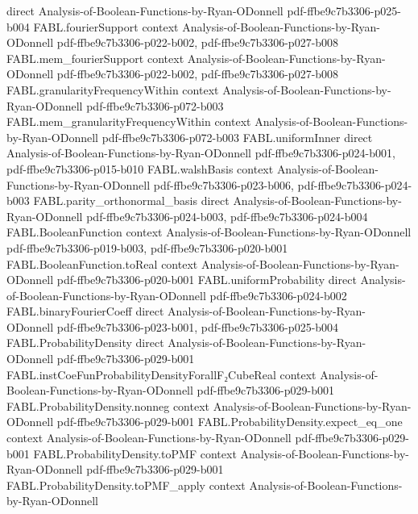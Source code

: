 \begin{theorem}
  {direct}
  {Analysis-of-Boolean-Functions-by-Ryan-ODonnell}
  {pdf-ffbe9c7b3306-p025-b004}
\proofstep
  {FABL.fourierSupport}
  {context}
  {Analysis-of-Boolean-Functions-by-Ryan-ODonnell}
  {pdf-ffbe9c7b3306-p022-b002,
    pdf-ffbe9c7b3306-p027-b008}
\proofstep
  {FABL.mem_fourierSupport}
  {context}
  {Analysis-of-Boolean-Functions-by-Ryan-ODonnell}
  {pdf-ffbe9c7b3306-p022-b002,
    pdf-ffbe9c7b3306-p027-b008}
\proofstep
  {FABL.granularityFrequencyWithin}
  {context}
  {Analysis-of-Boolean-Functions-by-Ryan-ODonnell}
  {pdf-ffbe9c7b3306-p072-b003}
\proofstep
  {FABL.mem_granularityFrequencyWithin}
  {context}
  {Analysis-of-Boolean-Functions-by-Ryan-ODonnell}
  {pdf-ffbe9c7b3306-p072-b003}
\proofstep
  {FABL.uniformInner}
  {direct}
  {Analysis-of-Boolean-Functions-by-Ryan-ODonnell}
  {pdf-ffbe9c7b3306-p024-b001,
    pdf-ffbe9c7b3306-p015-b010}
\proofstep
  {FABL.walshBasis}
  {context}
  {Analysis-of-Boolean-Functions-by-Ryan-ODonnell}
  {pdf-ffbe9c7b3306-p023-b006,
    pdf-ffbe9c7b3306-p024-b003}
\proofstep
  {FABL.parity_orthonormal_basis}
  {direct}
  {Analysis-of-Boolean-Functions-by-Ryan-ODonnell}
  {pdf-ffbe9c7b3306-p024-b003,
    pdf-ffbe9c7b3306-p024-b004}
\proofstep
  {FABL.BooleanFunction}
  {context}
  {Analysis-of-Boolean-Functions-by-Ryan-ODonnell}
  {pdf-ffbe9c7b3306-p019-b003,
    pdf-ffbe9c7b3306-p020-b001}
\proofstep
  {FABL.BooleanFunction.toReal}
  {context}
  {Analysis-of-Boolean-Functions-by-Ryan-ODonnell}
  {pdf-ffbe9c7b3306-p020-b001}
\proofstep
  {FABL.uniformProbability}
  {direct}
  {Analysis-of-Boolean-Functions-by-Ryan-ODonnell}
  {pdf-ffbe9c7b3306-p024-b002}
\proofstep
  {FABL.binaryFourierCoeff}
  {direct}
  {Analysis-of-Boolean-Functions-by-Ryan-ODonnell}
  {pdf-ffbe9c7b3306-p023-b001,
    pdf-ffbe9c7b3306-p025-b004}
\proofstep
  {FABL.ProbabilityDensity}
  {direct}
  {Analysis-of-Boolean-Functions-by-Ryan-ODonnell}
  {pdf-ffbe9c7b3306-p029-b001}
\proofstep
  {FABL.instCoeFunProbabilityDensityForallF₂CubeReal}
  {context}
  {Analysis-of-Boolean-Functions-by-Ryan-ODonnell}
  {pdf-ffbe9c7b3306-p029-b001}
\proofstep
  {FABL.ProbabilityDensity.nonneg}
  {context}
  {Analysis-of-Boolean-Functions-by-Ryan-ODonnell}
  {pdf-ffbe9c7b3306-p029-b001}
\proofstep
  {FABL.ProbabilityDensity.expect_eq_one}
  {context}
  {Analysis-of-Boolean-Functions-by-Ryan-ODonnell}
  {pdf-ffbe9c7b3306-p029-b001}
\proofstep
  {FABL.ProbabilityDensity.toPMF}
  {context}
  {Analysis-of-Boolean-Functions-by-Ryan-ODonnell}
  {pdf-ffbe9c7b3306-p029-b001}
\proofstep
  {FABL.ProbabilityDensity.toPMF_apply}
  {context}
  {Analysis-of-Boolean-Functions-by-Ryan-ODonnell}

\end{theorem}

